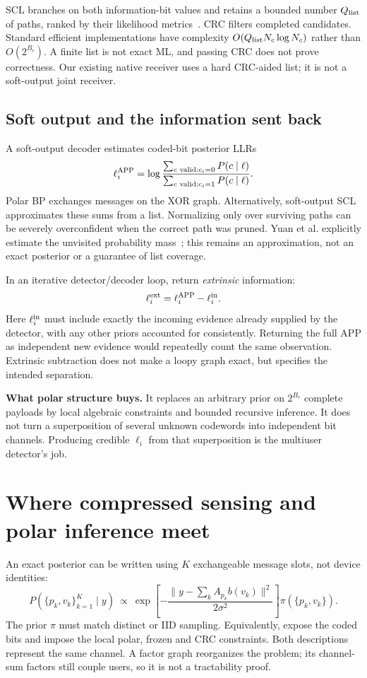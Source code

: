 \documentclass[10pt,a4paper]{article}
\begin{document}
SCL branches on both information-bit values and retains a bounded number $Q_{\rm list}$ of paths, ranked by their
likelihood metrics~\cite{tal}. CRC filters completed candidates. Standard efficient implementations have complexity
$O(Q_{\rm list}N_c\log N_c)$ rather than $O(2^{B_c})$. A finite list is not exact ML, and passing CRC does not prove
correctness. Our existing native receiver uses a hard CRC-aided list; it is not a soft-output joint receiver.

\subsection{Soft output and the information sent back}
A soft-output decoder estimates coded-bit posterior LLRs
\begin{equation}
 \ell_i^{\rm APP}=\log\frac{\sum_{c\text{ valid}:c_i=0}P(c\mid\ell)}
 {\sum_{c\text{ valid}:c_i=1}P(c\mid\ell)}.
\end{equation}
Polar BP exchanges messages on the XOR graph. Alternatively, soft-output SCL approximates these sums from a list.
Normalizing only over surviving paths can be severely overconfident when the correct path was pruned.
Yuan et al. explicitly estimate the unvisited probability mass~\cite{softscl}; this remains an approximation, not an
exact posterior or a guarantee of list coverage.

In an iterative detector/decoder loop, return \emph{extrinsic} information:
\begin{equation}
 \ell_i^{\rm ext}=\ell_i^{\rm APP}-\ell_i^{\rm in}.
\end{equation}
Here $\ell_i^{\rm in}$ must include exactly the incoming evidence already supplied by the detector, with any other
priors accounted for consistently. Returning the full APP as independent new evidence would repeatedly count the
same observation. Extrinsic subtraction does not make a loopy graph exact, but specifies the intended separation.

\textbf{What polar structure buys.} It replaces an arbitrary prior on $2^{B_c}$ complete payloads by local algebraic
constraints and bounded recursive inference. It does not turn a superposition of several unknown codewords into
independent bit channels. Producing credible $\ell_i$ from that superposition is the multiuser detector's job.

\clearpage
\section{Where compressed sensing and polar inference meet}
An exact posterior can be written using $K$ exchangeable message slots, not device identities:
\begin{equation}
 P(\{p_k,v_k\}_{k=1}^K\mid y)\ \propto\
 \exp\!\left[-\frac{\|y-\sum_k A_{p_k}b(v_k)\|^2}{2\sigma^2}\right]
 \pi(\{p_k,v_k\}).
 \label{eq:joint}
\end{equation}
The prior $\pi$ must match distinct or IID sampling. Equivalently, expose the coded bits and impose the local polar,
frozen and CRC constraints. Both descriptions represent the same channel. A factor graph reorganizes the problem;
its channel-sum factors still couple users, so it is not a tractability proof.
\end{document}
